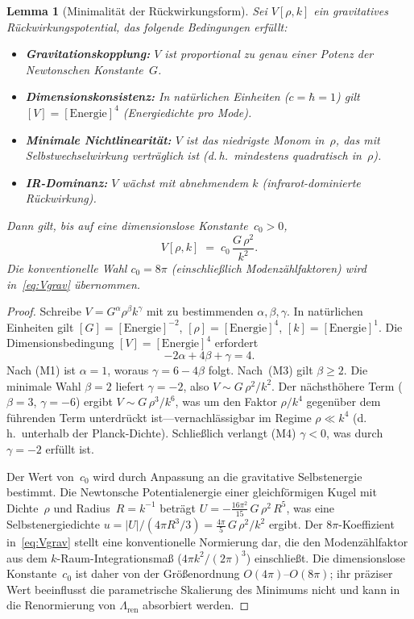 \documentclass[12pt,a4paper]{article}
\theoremstyle{definition}
\theoremstyle{plain}
\newtheorem{lemma}[definition]{Lemma}
\theoremstyle{remark}
\begin{document}
\begin{lemma}[Minimalit\"at der R\"uckwirkungsform]\label{lem:minimality}
Sei $V[\rho, k]$ ein gravitatives R\"uckwirkungspotential, das folgende Bedingungen erf\"ullt:
\begin{itemize}
    \item[\textup{(M1)}] \textbf{Gravitationskopplung:} $V$ ist proportional zu genau einer Potenz der Newtonschen Konstante~$G$.
    \item[\textup{(M2)}] \textbf{Dimensionskonsistenz:} In nat\"urlichen Einheiten ($c = \hbar = 1$) gilt $[V] = [\mathrm{Energie}]^4$ (Energiedichte pro Mode).
    \item[\textup{(M3)}] \textbf{Minimale Nichtlinearit\"at:} $V$ ist das \emph{niedrigste} Monom in~$\rho$, das mit Selbstwechselwirkung vertr\"aglich ist (d.\,h.\ mindestens quadratisch in~$\rho$).
    \item[\textup{(M4)}] \textbf{IR-Dominanz:} $V$ w\"achst mit abnehmendem $k$ (infrarot-dominierte R\"uckwirkung).
\end{itemize}
Dann gilt, bis auf eine dimensionslose Konstante~$c_0 > 0$,
\[
V[\rho, k] \;=\; c_0\,\frac{G\,\rho^2}{k^2}.
\]
Die konventionelle Wahl $c_0 = 8\pi$ (einschlie\ss lich
Modenz\"ahlfaktoren) wird in~\eqref{eq:Vgrav} \"ubernommen.
\end{lemma}

\begin{proof}
Schreibe $V = G^\alpha \rho^\beta k^\gamma$ mit zu bestimmenden $\alpha, \beta, \gamma$. In nat\"urlichen Einheiten gilt $[G] = [\mathrm{Energie}]^{-2}$, $[\rho] = [\mathrm{Energie}]^4$, $[k] = [\mathrm{Energie}]^1$. Die Dimensionsbedingung $[V] = [\mathrm{Energie}]^4$ erfordert
\[
-2\alpha + 4\beta + \gamma = 4.
\]
Nach (M1) ist $\alpha = 1$, woraus $\gamma = 6 - 4\beta$ folgt. Nach~(M3) gilt $\beta \ge 2$. Die minimale Wahl $\beta = 2$ liefert $\gamma = -2$, also $V \sim G\,\rho^2 / k^2$. Der n\"achsth\"ohere Term ($\beta = 3$, $\gamma = -6$) ergibt $V \sim G\,\rho^3 / k^6$, was um den Faktor $\rho / k^4$ gegen\"uber dem f\"uhrenden Term unterdr\"uckt ist---vernachl\"assigbar im Regime $\rho \ll k^4$ (d.\,h.\ unterhalb der Planck-Dichte). Schlie\ss lich verlangt (M4) $\gamma < 0$, was durch $\gamma = -2$ erf\"ullt ist.

Der Wert von~$c_0$ wird durch Anpassung an die gravitative
Selbstenergie bestimmt. Die Newtonsche Potentialenergie einer
gleichf\"ormigen Kugel mit Dichte~$\rho$ und Radius~$R = k^{-1}$
betr\"agt $U = -\frac{16\pi^2}{15}\,G\,\rho^2\,R^5$, was eine
Selbstenergiedichte $u = |U|/(4\pi R^3/3) =
\frac{4\pi}{5}\,G\,\rho^2/k^2$ ergibt. Der $8\pi$-Koeffizient
in~\eqref{eq:Vgrav} stellt eine konventionelle Normierung dar, die
den Modenz\"ahlfaktor aus dem $k$-Raum-Integrationsma\ss{}
($4\pi k^2/(2\pi)^3$) einschlie\ss t. Die dimensionslose
Konstante~$c_0$ ist daher von der Gr\"o\ss enordnung
$O(4\pi)$--$O(8\pi)$; ihr pr\"aziser Wert beeinflusst die
parametrische Skalierung des Minimums nicht und kann in die
Renormierung von $\Lambda_{\mathrm{ren}}$ absorbiert werden.
\end{proof}
\end{document}
